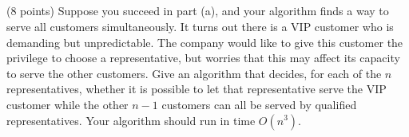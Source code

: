 \documentclass[12pt,a4paper]{article}
\begin{document}
\subsection{}

 (8 points) Suppose you succeed in part (a), and your algorithm finds a way to serve all customers simultaneously. It turns out there is a VIP customer who is demanding but unpredictable. The company would like to give this customer the privilege to choose a representative, but worries that this may affect its capacity to serve the other customers. Give an algorithm that decides, for each of the $n$ representatives, whether it is possible to let that representative serve the VIP customer while the other $n-1$ customers can all be served by qualified representatives. Your algorithm should run in time $O(n^3)$.
\end{document}
